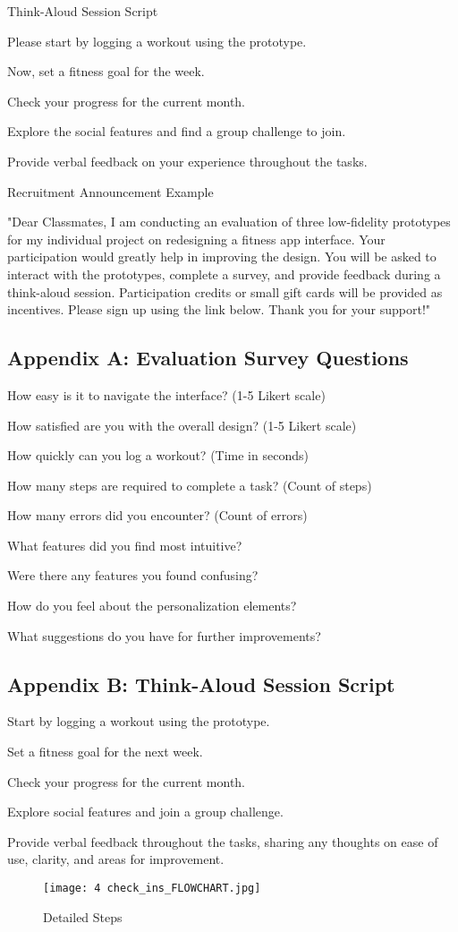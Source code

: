 \documentclass[
	letterpaper, %
]{jdf}
\begin{document}
Think-Aloud Session Script

Please start by logging a workout using the prototype.

Now, set a fitness goal for the week.

Check your progress for the current month.

Explore the social features and find a group challenge to join.

Provide verbal feedback on your experience throughout the tasks.

Recruitment Announcement Example

"Dear Classmates, I am conducting an evaluation of three low-fidelity prototypes for my individual project on redesigning a fitness app interface. Your participation would greatly help in improving the design. You will be asked to interact with the prototypes, complete a survey, and provide feedback during a think-aloud session. Participation credits or small gift cards will be provided as incentives. Please sign up using the link below. Thank you for your support!"

\subsection{Appendix A: Evaluation Survey Questions}
How easy is it to navigate the interface? (1-5 Likert scale)

How satisfied are you with the overall design? (1-5 Likert scale)

How quickly can you log a workout? (Time in seconds)

How many steps are required to complete a task? (Count of steps)

How many errors did you encounter? (Count of errors)

What features did you find most intuitive?

Were there any features you found confusing?

How do you feel about the personalization elements?

What suggestions do you have for further improvements?

\subsection{Appendix B: Think-Aloud Session Script}
Start by logging a workout using the prototype.

Set a fitness goal for the next week.

Check your progress for the current month.

Explore social features and join a group challenge.

Provide verbal feedback throughout the tasks, sharing any thoughts on ease of use, clarity, and areas for improvement.

\begin{figure}
    \centering
    \texttt{[image: 4 check\_ins\_FLOWCHART.jpg]}
    \caption{Detailed Steps}
    \label{fig:enter-label}
\end{figure}
\end{document}
